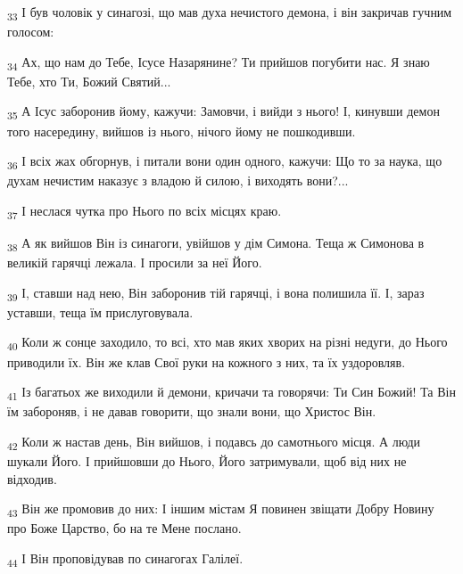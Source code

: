 \begin{tcolorbox}
\textsubscript{33} І був чоловік у синагозі, що мав духа нечистого демона, і він закричав гучним голосом:
\end{tcolorbox}
\begin{tcolorbox}
\textsubscript{34} Ах, що нам до Тебе, Ісусе Назарянине? Ти прийшов погубити нас. Я знаю Тебе, хто Ти, Божий Святий...
\end{tcolorbox}
\begin{tcolorbox}
\textsubscript{35} А Ісус заборонив йому, кажучи: Замовчи, і вийди з нього! І, кинувши демон того насередину, вийшов із нього, нічого йому не пошкодивши.
\end{tcolorbox}
\begin{tcolorbox}
\textsubscript{36} І всіх жах обгорнув, і питали вони один одного, кажучи: Що то за наука, що духам нечистим наказує з владою й силою, і виходять вони?...
\end{tcolorbox}
\begin{tcolorbox}
\textsubscript{37} І неслася чутка про Нього по всіх місцях краю.
\end{tcolorbox}
\begin{tcolorbox}
\textsubscript{38} А як вийшов Він із синагоги, увійшов у дім Симона. Теща ж Симонова в великій гарячці лежала. І просили за неї Його.
\end{tcolorbox}
\begin{tcolorbox}
\textsubscript{39} І, ставши над нею, Він заборонив тій гарячці, і вона полишила її. І, зараз уставши, теща їм прислуговувала.
\end{tcolorbox}
\begin{tcolorbox}
\textsubscript{40} Коли ж сонце заходило, то всі, хто мав яких хворих на різні недуги, до Нього приводили їх. Він же клав Свої руки на кожного з них, та їх уздоровляв.
\end{tcolorbox}
\begin{tcolorbox}
\textsubscript{41} Із багатьох же виходили й демони, кричачи та говорячи: Ти Син Божий! Та Він їм забороняв, і не давав говорити, що знали вони, що Христос Він.
\end{tcolorbox}
\begin{tcolorbox}
\textsubscript{42} Коли ж настав день, Він вийшов, і подавсь до самотнього місця. А люди шукали Його. І прийшовши до Нього, Його затримували, щоб від них не відходив.
\end{tcolorbox}
\begin{tcolorbox}
\textsubscript{43} Він же промовив до них: І іншим містам Я повинен звіщати Добру Новину про Боже Царство, бо на те Мене послано.
\end{tcolorbox}
\begin{tcolorbox}
\textsubscript{44} І Він проповідував по синагогах Галілеї.
\end{tcolorbox}
